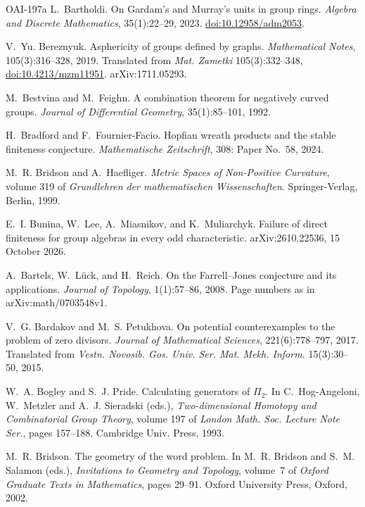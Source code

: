 \documentclass[11pt]{article}
\theoremstyle{definition}
\theoremstyle{plain}
\newcommand{\doi}[1]{\href{https://doi.org/#1}{doi:#1}}
\begin{document}
\begin{thebibliography}{OAI-197a}
L.~Bartholdi.
\newblock On {G}ardam's and {M}urray's units in group rings.
\newblock \emph{Algebra and Discrete Mathematics}, 35(1):22--29, 2023. \doi{10.12958/adm2053}.

V.~Yu. Bereznyuk.
\newblock Asphericity of groups defined by graphs.
\newblock \emph{Mathematical Notes}, 105(3):316--328, 2019. Translated from \emph{Mat. Zametki} 105(3):332--348, \doi{10.4213/mzm11951}. arXiv:1711.05293.

M.~Bestvina and M.~Feighn.
\newblock A combination theorem for negatively curved groups.
\newblock \emph{Journal of Differential Geometry}, 35(1):85--101, 1992.

H.~Bradford and F.~Fournier-Facio.
\newblock Hopfian wreath products and the stable finiteness conjecture.
\newblock \emph{Mathematische Zeitschrift}, 308: Paper No.~58, 2024.

M.~R. Bridson and A.~Haefliger.
\newblock \emph{Metric Spaces of Non-Positive Curvature}, volume 319 of \emph{Grundlehren der mathematischen Wissenschaften}.
\newblock Springer-Verlag, Berlin, 1999.

E.~I. Bunina, W.~Lee, A.~Miasnikov, and K.~Muliarchyk.
\newblock Failure of direct finiteness for group algebras in every odd characteristic.
\newblock arXiv:2610.22536, 15 October 2026.

A.~Bartels, W.~L\"uck, and H.~Reich.
\newblock On the Farrell--Jones conjecture and its applications.
\newblock \emph{Journal of Topology}, 1(1):57--86, 2008. Page numbers as in arXiv:math/0703548v1.

V.~G. Bardakov and M.~S. Petukhova.
\newblock On potential counterexamples to the problem of zero divisors.
\newblock \emph{Journal of Mathematical Sciences}, 221(6):778--797, 2017. Translated from \emph{Vestn. Novosib. Gos. Univ. Ser. Mat. Mekh. Inform.} 15(3):30--50, 2015.

W.~A. Bogley and S.~J. Pride.
\newblock Calculating generators of $\Pi_2$.
\newblock In C.~Hog-Angeloni, W.~Metzler and A.~J. Sieradski (eds.), \emph{Two-dimensional Homotopy and Combinatorial Group Theory}, volume 197 of \emph{London Math. Soc. Lecture Note Ser.}, pages 157--188. Cambridge Univ. Press, 1993.

M.~R. Bridson.
\newblock The geometry of the word problem.
\newblock In M.~R. Bridson and S.~M. Salamon (eds.), \emph{Invitations to Geometry and Topology}, volume~7 of \emph{Oxford Graduate Texts in Mathematics}, pages 29--91. Oxford University Press, Oxford, 2002.


\end{thebibliography}
\end{document}

